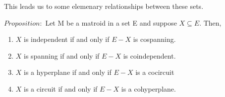 This leads us to some elemenary relationships between these sets. 

$Proposition:$ Let M be a matroid in a set E and suppose $X \subseteq E$. Then,
    \begin{enumerate}
        \item $X$ is independent if and only if $E-X$ is cospanning.

        \item $X$ is spanning if and only if $E-X$ is coindependent.

        \item $X$ is a hyperplane if and only if $E-X$ is a cocircuit

        \item $X$ is a circuit if and only if $E-X$ is a cohyperplane.
    \end{enumerate}

